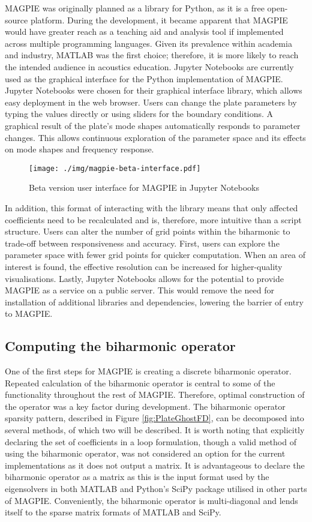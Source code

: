 \noindent
MAGPIE was originally planned as a library for Python, as it is a free open-source platform. During the development, it became apparent that MAGPIE would have greater reach as a teaching aid and analysis tool if implemented across multiple programming languages.  Given its prevalence within academia and industry, MATLAB was the first choice; therefore, it is more likely to reach the intended audience in acoustics education. Jupyter Notebooks are currently used as the graphical interface for the Python implementation of MAGPIE. Jupyter Notebooks were chosen for their graphical interface library, which allows easy deployment in the web browser. Users can change the plate parameters by typing the values directly or using sliders for the boundary conditions. A graphical result of the plate's mode shapes automatically responds to parameter changes. This allows continuous exploration of the parameter space and its effects on mode shapes and frequency response.
\begin{figure}[H]
    \centering
    \texttt{[image: ./img/magpie-beta-interface.pdf]}
    \caption{Beta version user interface for MAGPIE in Jupyter Notebooks}
    \label{fig:magpie-ui}
\end{figure}
In addition, this format of interacting with the library means that only affected coefficients need to be recalculated and is, therefore, more intuitive than a script structure. Users can alter the number of grid points within the biharmonic to trade-off between responsiveness and accuracy. First, users can explore the parameter space with fewer grid points for quicker computation. When an area of interest is found, the effective resolution can be increased for higher-quality visualisations. Lastly, Jupyter Notebooks allows for the potential to provide MAGPIE as a service on a public server. This would remove the need for installation of additional libraries and dependencies, lowering the barrier of entry to MAGPIE. 

\subsection{Computing the biharmonic operator}

One of the first steps for MAGPIE is creating a discrete biharmonic operator. Repeated calculation of the biharmonic operator is central to some of the functionality throughout the rest of MAGPIE. Therefore, optimal construction of the operator was a key factor during development. The biharmonic operator sparsity pattern, described in Figure \ref{fig:PlateGhostFD},  can be decomposed into several methods, of which two will be described. It is worth noting that explicitly declaring the set of coefficients in a loop formulation, though a valid method of using the biharmonic operator, was not considered an option for the current implementations as it does not output a matrix. It is advantageous to declare the biharmonic operator as a matrix as this is the input format used by the eigensolvers in both MATLAB and Python's SciPy package utilised in other parts of MAGPIE. Conveniently, the biharmonic operator is multi-diagonal and lends itself to the sparse matrix formats of MATLAB and SciPy.\\
 
